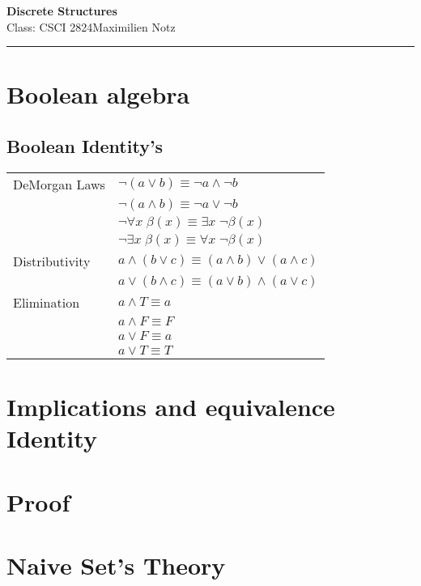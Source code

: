 \documentclass[5pt]{article}
\begin{document}
\begin{center}
     \Large{\textbf{Discrete Structures}}\\
     \small{Class: CSCI 2824}\hfill\small{\textcopyright Maximilien Notz \the\year{}}
     \noindent\rule{20.2cm}{0.4pt}
\end{center}


\begin{multicols}{2}
\setcounter{secnumdepth}{0}


\section{Boolean algebra}
\subsection{Boolean Identity's}
\begin{tabular}{ll}
    DeMorgan Laws    & $\lnot(a\lor b)\equiv \lnot a\land\lnot b$\\
                     & $\lnot(a\land b)\equiv \lnot a\lor\lnot b$\\
                     & $\lnot\forall x\;\beta(x)\equiv\exists x\;\lnot\beta(x) $\\
                     & $\lnot\exists x\;\beta(x)\equiv\forall x\;\lnot\beta(x) $\\
    Distributivity   & $a\land(b\lor c)\equiv(a\land b)\lor(a\land c)$\\
                     & $a\lor(b\land c)\equiv(a\lor b)\land(a\lor c)$\\
    Elimination      & $a\land T\equiv a$\\
                     & $a\land F\equiv F$\\
                     & $a\lor F\equiv a$\\
                     & $a\lor T\equiv T$\\
\end{tabular}

\section{Implications and equivalence Identity}

\section{Proof}

\section{Naive Set's Theory}

\end{multicols}
\end{document}
